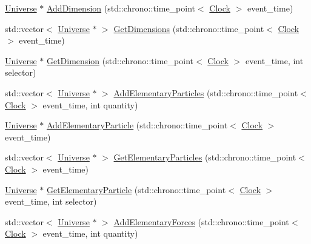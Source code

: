 \begin{DoxyCompactItemize}
\item 
\mbox{\hyperlink{class_universe}{Universe}} $\ast$ \mbox{\hyperlink{class_universe_a6326158c47bf3f7fe9297299a9b5b7b7}{Add\+Dimension}} (std\+::chrono\+::time\+\_\+point$<$ \mbox{\hyperlink{universe_8h_a0ef8d951d1ca5ab3cfaf7ab4c7a6fd80}{Clock}} $>$ event\+\_\+time)
\item 
std\+::vector$<$ \mbox{\hyperlink{class_universe}{Universe}} $\ast$ $>$ \mbox{\hyperlink{class_universe_a1869fc7bf43827378bab5a701f7f917a}{Get\+Dimensions}} (std\+::chrono\+::time\+\_\+point$<$ \mbox{\hyperlink{universe_8h_a0ef8d951d1ca5ab3cfaf7ab4c7a6fd80}{Clock}} $>$ event\+\_\+time)
\item 
\mbox{\hyperlink{class_universe}{Universe}} $\ast$ \mbox{\hyperlink{class_universe_ab79a380dee684c6dc304b571f4d28645}{Get\+Dimension}} (std\+::chrono\+::time\+\_\+point$<$ \mbox{\hyperlink{universe_8h_a0ef8d951d1ca5ab3cfaf7ab4c7a6fd80}{Clock}} $>$ event\+\_\+time, int selector)
\item 
std\+::vector$<$ \mbox{\hyperlink{class_universe}{Universe}} $\ast$ $>$ \mbox{\hyperlink{class_universe_a857cf7f208cd11c80736e82fa523feb5}{Add\+Elementary\+Particles}} (std\+::chrono\+::time\+\_\+point$<$ \mbox{\hyperlink{universe_8h_a0ef8d951d1ca5ab3cfaf7ab4c7a6fd80}{Clock}} $>$ event\+\_\+time, int quantity)
\item 
\mbox{\hyperlink{class_universe}{Universe}} $\ast$ \mbox{\hyperlink{class_universe_ab9c84e0576de50aa4fa46655832ce5e4}{Add\+Elementary\+Particle}} (std\+::chrono\+::time\+\_\+point$<$ \mbox{\hyperlink{universe_8h_a0ef8d951d1ca5ab3cfaf7ab4c7a6fd80}{Clock}} $>$ event\+\_\+time)
\item 
std\+::vector$<$ \mbox{\hyperlink{class_universe}{Universe}} $\ast$ $>$ \mbox{\hyperlink{class_universe_a168fd9bf7602adcba1de5dd93a212775}{Get\+Elementary\+Particles}} (std\+::chrono\+::time\+\_\+point$<$ \mbox{\hyperlink{universe_8h_a0ef8d951d1ca5ab3cfaf7ab4c7a6fd80}{Clock}} $>$ event\+\_\+time)
\item 
\mbox{\hyperlink{class_universe}{Universe}} $\ast$ \mbox{\hyperlink{class_universe_acef54e17666d17078c522388f8f6e4f9}{Get\+Elementary\+Particle}} (std\+::chrono\+::time\+\_\+point$<$ \mbox{\hyperlink{universe_8h_a0ef8d951d1ca5ab3cfaf7ab4c7a6fd80}{Clock}} $>$ event\+\_\+time, int selector)
\item 
std\+::vector$<$ \mbox{\hyperlink{class_universe}{Universe}} $\ast$ $>$ \mbox{\hyperlink{class_universe_a81d294300346e9f901836ab609cce942}{Add\+Elementary\+Forces}} (std\+::chrono\+::time\+\_\+point$<$ \mbox{\hyperlink{universe_8h_a0ef8d951d1ca5ab3cfaf7ab4c7a6fd80}{Clock}} $>$ event\+\_\+time, int quantity)

\end{DoxyCompactItemize}
